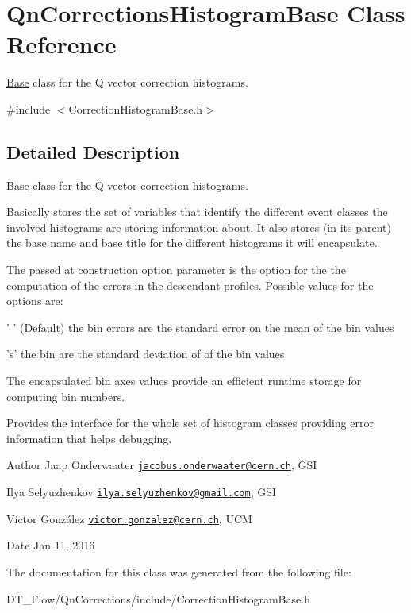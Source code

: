 \hypertarget{classQnCorrectionsHistogramBase}{}\section{Qn\+Corrections\+Histogram\+Base Class Reference}
\label{classQnCorrectionsHistogramBase}


\mbox{\hyperlink{classBase}{Base}} class for the Q vector correction histograms.  




{\ttfamily \#include $<$Correction\+Histogram\+Base.\+h$>$}



\subsection{Detailed Description}
\mbox{\hyperlink{classBase}{Base}} class for the Q vector correction histograms. 

Basically stores the set of variables that identify the different event classes the involved histograms are storing information about. It also stores (in its parent) the base name and base title for the different histograms it will encapsulate.

The passed at construction option parameter is the option for the the computation of the errors in the descendant profiles. Possible values for the options are\+: \begin{DoxyVerb}' '  (Default) the bin errors are the standard error on the mean of the
     bin values

's'            the bin are the standard deviation of of the bin values
\end{DoxyVerb}


The encapsulated bin axes values provide an efficient runtime storage for computing bin numbers.

Provides the interface for the whole set of histogram classes providing error information that helps debugging.

\begin{DoxyAuthor}{Author}
Jaap Onderwaater \href{mailto:jacobus.onderwaater@cern.ch}{\tt jacobus.\+onderwaater@cern.\+ch}, G\+SI 

Ilya Selyuzhenkov \href{mailto:ilya.selyuzhenkov@gmail.com}{\tt ilya.\+selyuzhenkov@gmail.\+com}, G\+SI 

Víctor González \href{mailto:victor.gonzalez@cern.ch}{\tt victor.\+gonzalez@cern.\+ch}, U\+CM 
\end{DoxyAuthor}
\begin{DoxyDate}{Date}
Jan 11, 2016 
\end{DoxyDate}


The documentation for this class was generated from the following file\+:\begin{DoxyCompactItemize}
\item 
D\+T\+\_\+\+Flow/\+Qn\+Corrections/include/Correction\+Histogram\+Base.\+h\end{DoxyCompactItemize}
